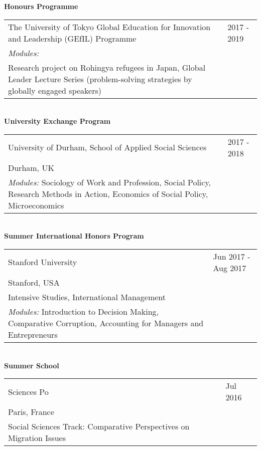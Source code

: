 \documentclass[11pt, a4paper]{article}
\begin{document}
\noindent \textbf{Honours Programme} \\
\begin{tabular}{@{}p{}p{}}
The University of Tokyo Global Education for Innovation and Leadership (GEfIL) Programme & \hfill 2017 - 2019 \\
\textit{Modules:} \\
Research project on Rohingya refugees in Japan, Global Leader Lecture Series (problem-solving strategies by globally engaged speakers) \\
\end{tabular} \\

\noindent \textbf{University Exchange Program} \\
\begin{tabular}{@{}p{}p{}}
\noindent University of Durham, School of Applied Social Sciences & \hfill 2017 - 2018 \\
\noindent Durham, UK \\
\textit{Modules:} Sociology of Work and Profession, Social Policy, Research Methods in Action, Economics of Social Policy, Microeconomics \\
\end{tabular} \\

\noindent \textbf{Summer International Honors Program} \\
\begin{tabular}{@{}p{}p{}}
\noindent Stanford University & \hfill Jun 2017 - Aug 2017 \\
Stanford, USA \\
Intensive Studies, International Management \\
\textit{Modules:} Introduction to Decision Making, Comparative Corruption, Accounting for Managers and Entrepreneurs \\
\end{tabular} \\

\noindent \textbf{Summer School} \\
\begin{tabular}{@{}p{}p{}}
\noindent Sciences Po & \hfill Jul 2016 \\
Paris, France \\
Social Sciences Track: Comparative Perspectives on Migration Issues \\
\end{tabular}
\end{document}
